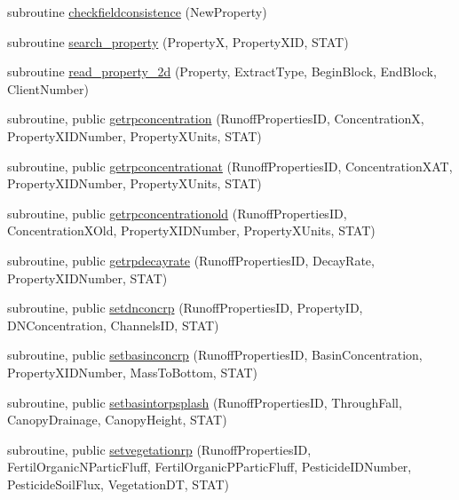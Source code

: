 \begin{DoxyCompactItemize}
\item 
subroutine \mbox{\hyperlink{namespacemodulerunoffproperties_a06845b65870b1cb0e5333b9ef618d43d}{checkfieldconsistence}} (New\+Property)
\item 
subroutine \mbox{\hyperlink{namespacemodulerunoffproperties_a13bbe5dac13800aec15511ca3b8b2a66}{search\+\_\+property}} (PropertyX, Property\+X\+ID, S\+T\+AT)
\item 
subroutine \mbox{\hyperlink{namespacemodulerunoffproperties_afc75586d1d0e2fe3793c44849c61d34a}{read\+\_\+property\+\_\+2d}} (Property, Extract\+Type, Begin\+Block, End\+Block, Client\+Number)
\item 
subroutine, public \mbox{\hyperlink{namespacemodulerunoffproperties_a573e563dd1e9a23460bac6983ddf6ceb}{getrpconcentration}} (Runoff\+Properties\+ID, ConcentrationX, Property\+X\+I\+D\+Number, Property\+X\+Units, S\+T\+AT)
\item 
subroutine, public \mbox{\hyperlink{namespacemodulerunoffproperties_adc6e3ba349efad4b60c9287d22e284e9}{getrpconcentrationat}} (Runoff\+Properties\+ID, Concentration\+X\+AT, Property\+X\+I\+D\+Number, Property\+X\+Units, S\+T\+AT)
\item 
subroutine, public \mbox{\hyperlink{namespacemodulerunoffproperties_a2a7cc1e8991c2e54574415d7f00a5874}{getrpconcentrationold}} (Runoff\+Properties\+ID, Concentration\+X\+Old, Property\+X\+I\+D\+Number, Property\+X\+Units, S\+T\+AT)
\item 
subroutine, public \mbox{\hyperlink{namespacemodulerunoffproperties_a948f11bb3ded4d5dcba4b7d9ddb002f9}{getrpdecayrate}} (Runoff\+Properties\+ID, Decay\+Rate, Property\+X\+I\+D\+Number, S\+T\+AT)
\item 
subroutine, public \mbox{\hyperlink{namespacemodulerunoffproperties_af1a385e164dd67d336a71fada3a6e2b2}{setdnconcrp}} (Runoff\+Properties\+ID, Property\+ID, D\+N\+Concentration, Channels\+ID, S\+T\+AT)
\item 
subroutine, public \mbox{\hyperlink{namespacemodulerunoffproperties_a5a59647a877b86974489e072330e3b92}{setbasinconcrp}} (Runoff\+Properties\+ID, Basin\+Concentration, Property\+X\+I\+D\+Number, Mass\+To\+Bottom, S\+T\+AT)
\item 
subroutine, public \mbox{\hyperlink{namespacemodulerunoffproperties_a38a9e34b9711a489d98165b72541a7b6}{setbasintorpsplash}} (Runoff\+Properties\+ID, Through\+Fall, Canopy\+Drainage, Canopy\+Height, S\+T\+AT)
\item 
subroutine, public \mbox{\hyperlink{namespacemodulerunoffproperties_a63a750ecc17b3e0301717d8bc71858f2}{setvegetationrp}} (Runoff\+Properties\+ID, Fertil\+Organic\+N\+Partic\+Fluff, Fertil\+Organic\+P\+Partic\+Fluff, Pesticide\+I\+D\+Number, Pesticide\+Soil\+Flux, Vegetation\+DT, S\+T\+AT)

\end{DoxyCompactItemize}
